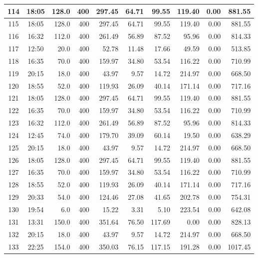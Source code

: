 \begin{landscape}
\begin{longtable}{|c|c|r|r|r|r|r|r|r|r|}
\hline
114 & 18:05 & 128.0 & 400 & 297.45 & 64.71 & 99.55 & 119.40 & 0.00 & 881.55 \\
\hline
\rowcolor{gray!8}
115 & 18:05 & 128.0 & 400 & 297.45 & 64.71 & 99.55 & 119.40 & 0.00 & 881.55 \\
\hline
116 & 16:32 & 112.0 & 400 & 261.49 & 56.89 & 87.52 & 95.96 & 0.00 & 814.33 \\
\hline
\rowcolor{gray!8}
117 & 12:50 & 20.0 & 400 & 52.78 & 11.48 & 17.66 & 49.59 & 0.00 & 513.85 \\
\hline
118 & 16:35 & 70.0 & 400 & 159.97 & 34.80 & 53.54 & 116.22 & 0.00 & 710.99 \\
\hline
\rowcolor{gray!8}
119 & 20:15 & 18.0 & 400 & 43.97 & 9.57 & 14.72 & 214.97 & 0.00 & 668.50 \\
\hline
120 & 18:55 & 52.0 & 400 & 119.93 & 26.09 & 40.14 & 171.14 & 0.00 & 717.16 \\
\hline
\rowcolor{gray!8}
121 & 18:05 & 128.0 & 400 & 297.45 & 64.71 & 99.55 & 119.40 & 0.00 & 881.55 \\
\hline
122 & 16:35 & 70.0 & 400 & 159.97 & 34.80 & 53.54 & 116.22 & 0.00 & 710.99 \\
\hline
\rowcolor{gray!8}
123 & 16:32 & 112.0 & 400 & 261.49 & 56.89 & 87.52 & 95.96 & 0.00 & 814.33 \\
\hline
124 & 12:45 & 74.0 & 400 & 179.70 & 39.09 & 60.14 & 19.50 & 0.00 & 638.29 \\
\hline
\rowcolor{gray!8}
125 & 20:15 & 18.0 & 400 & 43.97 & 9.57 & 14.72 & 214.97 & 0.00 & 668.50 \\
\hline
126 & 18:05 & 128.0 & 400 & 297.45 & 64.71 & 99.55 & 119.40 & 0.00 & 881.55 \\
\hline
\rowcolor{gray!8}
127 & 16:35 & 70.0 & 400 & 159.97 & 34.80 & 53.54 & 116.22 & 0.00 & 710.99 \\
\hline
128 & 18:55 & 52.0 & 400 & 119.93 & 26.09 & 40.14 & 171.14 & 0.00 & 717.16 \\
\hline
\rowcolor{gray!8}
129 & 20:33 & 54.0 & 400 & 124.46 & 27.08 & 41.65 & 202.78 & 0.00 & 754.31 \\
\hline
130 & 19:54 & 6.0 & 400 & 15.22 & 3.31 & 5.10 & 223.54 & 0.00 & 642.08 \\
\hline
\rowcolor{gray!8}
131 & 13:31 & 150.0 & 400 & 351.64 & 76.50 & 117.69 & 0.00 & 0.00 & 828.13 \\
\hline
132 & 20:15 & 18.0 & 400 & 43.97 & 9.57 & 14.72 & 214.97 & 0.00 & 668.50 \\
\hline
\rowcolor{gray!8}
133 & 22:25 & 154.0 & 400 & 350.03 & 76.15 & 117.15 & 191.28 & 0.00 & 1017.45 \\

\end{longtable}
\end{landscape}
